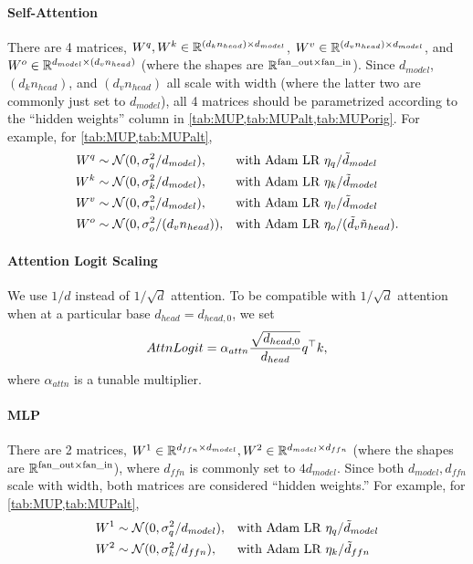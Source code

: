 \documentclass{article}
\theoremstyle{definition}
\newcommand{\fanin}{\mathrm{fan\_in}}
\newcommand{\fanout}{\mathrm{fan\_out}}
\begin{document}
\paragraph{Self-Attention}
There are 4 matrices, $W^q, W^k \in \mathbb{R}^{(d_k n_{head}) \times d_{model}}$, $W^v \in \mathbb{R}^{(d_v n_{head}) \times d_{model}}$, and $W^o \in\mathbb{R}^{d_{model} \times (d_v n_{head})}$ (where the shapes are $\R^{\fanout \times \fanin}$).
Since $d_{model}$, $(d_k n_{head})$, and $(d_v n_{head})$ all scale with width (where the latter two are commonly just set to $d_{model}$), all 4 matrices should be parametrized according to the ``hidden weights'' column in \cref{tab:MUP,tab:MUPalt,tab:MUPorig}.
For example, for \cref{tab:MUP,tab:MUPalt},
\begin{align*}
  W^q &\sim \mathcal{N}(0, \sigma_q^2/d_{model}),&&\text{with Adam LR }\eta_{q}/\tilde d_{model}\\
  W^k &\sim \mathcal{N}(0, \sigma_k^2/d_{model}),&&\text{with Adam LR }\eta_{k}/\tilde d_{model}\\
  W^v &\sim \mathcal{N}(0, \sigma_v^2/d_{model}),&&\text{with Adam LR }\eta_{v}/\tilde d_{model}\\
  W^o &\sim \mathcal{N}(0, \sigma_o^2/(d_v n_{head})),&&\text{with Adam LR }\eta_{o}/(\tilde d_v \tilde n_{head}).
\end{align*}

\paragraph{Attention Logit Scaling}

We use $1/d$ instead of $1/\sqrt{d}$ attention.
To be compatible with $1/\sqrt{d}$ attention when at a particular base $d_{head} = d_{head,0}$, we set
\[AttnLogit = \alpha_{attn}\frac{\sqrt{d_{head,0}}}{d_{head}} q^\top k,\]
where $\alpha_{attn}$ is a tunable multiplier.

\paragraph{MLP}
There are 2 matrices, $W^1 \in \mathbb{R}^{d_{ffn}\times d_{model}}, W^2 \in \mathbb{R}^{d_{model} \times d_{ffn}}$ (where the shapes are $\R^{\fanout \times \fanin}$), where $d_{ffn}$ is commonly set to $4 d_{model}$.
Since both $d_{model}, d_{ffn}$ scale with width, both matrices are considered ``hidden weights.''
For example, for \cref{tab:MUP,tab:MUPalt},
\begin{align*}
  W^1 &\sim \mathcal{N}(0, \sigma_q^2/d_{model}),&&\text{with Adam LR }\eta_{q}/\tilde d_{model}\\
  W^2 &\sim \mathcal{N}(0, \sigma_k^2/d_{ffn}),&&\text{with Adam LR }\eta_{k}/\tilde d_{ffn}
\end{align*}
\end{document}
